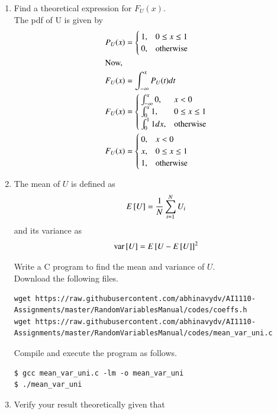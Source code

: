 \documentclass[journal,12pt,twocolumn]{IEEEtran}
\renewcommand\thesection{\arabic{section}}
\begin{document}
\begin{enumerate}[label=\thesection.\arabic*
        ,ref=\thesection.\theenumi]
    \item
          Find a  theoretical expression for $F_{U}(x)$.\\
          \solution
          The pdf of U is given by
          \begin{align}
              P_U(x) & = \begin{cases}
                  1, & 0 \le x \le 1    \\
                  0, & \text{otherwise} \\
              \end{cases}    \\
              \intertext{Now,}
              F_U(x) & = \int_{-\infty}^{x} P_U(t) dt \\
              F_U(x) & = \begin{cases}
                  \int_{-\infty}^{x} 0, & x < 0            \\
                  \int_{0}^{x}1,        & 0 \le x \le 1    \\
                  \int_0^11dx,          & \text{otherwise}
              \end{cases}    \\
              F_U(x) & = \begin{cases}
                  0, & x < 0            \\
                  x, & 0 \le x \le 1    \\
                  1, & \text{otherwise}
              \end{cases}
          \end{align}


    \item
          The mean of $U$ is defined as
          \begin{equation}
              E{}\left[U\right] = \frac{1}{N}\sum_{i=1}^{N}U_i
          \end{equation}
          and its variance as
          \begin{equation}
              \text{var}{}\left[U\right] = E{}\left[U- E{}\left[U\right]\right]^2
          \end{equation}

          Write a C program to  find the mean and variance of $U$.\\
          \solution Download the following files.
          \begin{lstlisting}
wget https://raw.githubusercontent.com/abhinavydv/AI1110-Assignments/master/RandomVariablesManual/codes/coeffs.h
wget https://raw.githubusercontent.com/abhinavydv/AI1110-Assignments/master/RandomVariablesManual/codes/mean_var_uni.c
        \end{lstlisting}

          Compile and execute the program as follows.
          \begin{lstlisting}
$ gcc mean_var_uni.c -lm -o mean_var_uni
$ ./mean_var_uni
        \end{lstlisting}
    \item Verify your result theoretically given that
\end{enumerate}
\end{document}
